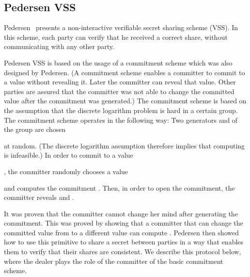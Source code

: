 \documentclass[10pt]{svjour3}
\begin{document}
\label{crypto2}
\subsection{Pedersen VSS}\label{Pedersen2}

Pedersen~\cite{Pedersen91} presents a non-interactive verifiable
secret sharing scheme (VSS). In this scheme, each party can verify that he received a
correct share, without communicating with any other party.

Pedersen VSS is based on the usage of a commitment scheme which was
also designed by Pedersen. (A commitment scheme enables a committer to
commit to a value without revealing it. Later the committer can reveal
that value. Other parties are assured that the committer was not able
to change the committed value after the commitment was generated.)
The commitment scheme
is based on the assumption that the discrete logarithm problem is hard
in a certain group. The commitment scheme operates in the following
way: Two generators  and  of the group are chosen  at random. (The discrete logarithm assumption therefore
implies that computing  is infeasible.)  In order to
commit to a value  \ignore{}, the committer randomly
chooses a value  \ignore{} and computes the
commitment .
Then, in order to open the commitment, the committer reveals 
and .

It was proven that the committer cannot change her mind after
generating the commitment. This was proved by showing that a committer
that can change the committed value from  to a different value 
can compute . Pedersen then showed how to use this primitive
to share a secret  between  parties in a way that enables them
to verify that their shares are consistent. We describe this protocol
below,
where the
dealer  plays the role of the committer of the basic commitment
scheme.
\end{document}
